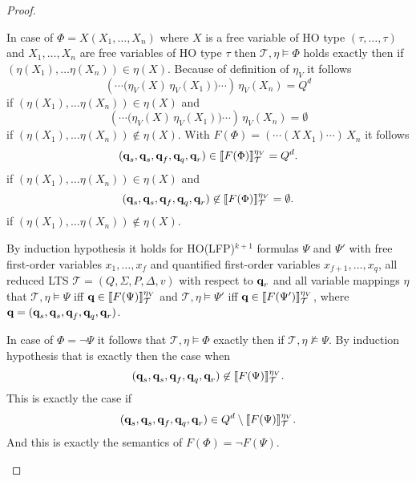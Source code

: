 \begin{proof}
\begin{compactitem}
        \item In case of $\Phi = X(X_1, \dots, X_n)$ where $X$ is a free variable of HO type $(\tau, \dots,
        \tau)$ and $X_1, \dots, X_n$ are free variables of HO type $\tau$ then $\mathcal{T}, \eta \models \Phi$
        holds exactly then if $(\eta(X_1), \dots \eta(X_n)) \in \eta(X)$. Because of definition of $\eta_V$ it follows
        \[(\dotsb\big(\eta_V(X)\,\eta_V(X_1)\big)\dotsb)\,\eta_V(X_n) = Q^d\]
        if $(\eta(X_1), \dots \eta(X_n)) \in \eta(X)$ and
        \[(\dotsb\big(\eta_V(X)\,\eta_V(X_1)\big)\dotsb)\,\eta_V(X_n) = \emptyset\]
        if $(\eta(X_1), \dots \eta(X_n)) \not\in \eta(X)$. With $F(\Phi) = (\dotsb (X\,X_1)\dotsb)\,X_n$
        it follows
        \[ (\emph{q}_s, \emph{q}_s, \emph{q}_f, \emph{q}_q, \emph{q}_r) \in \llbracket F(\Phi) \rrbracket^{\eta_V}_\mathcal{T} = Q^d.\]
        if $(\eta(X_1), \dots \eta(X_n))\in \eta(X)$ and
        \[ (\emph{q}_s, \emph{q}_s, \emph{q}_f, \emph{q}_q, \emph{q}_r) \not\in \llbracket F(\Phi)
        \rrbracket^{\eta_V}_\mathcal{T} = \emptyset.\]
        if $(\eta(X_1), \dots \eta(X_n)) \not\in \eta(X)$.
    \end{compactitem}
    
    By induction hypothesis it holds for HO(LFP)$^{k+1}$ formulas $\Psi$ and $\Psi'$ with free first-order variables $x_1,
    \dots, x_f$ and quantified first-order variables $x_{f+1}, \dots, x_q$, all reduced LTS $\mathcal{T} = (Q, \Sigma, P,
    \Delta, v)$ with respect to $\emph{q}_r$ and all variable mappings $\eta$  that $\mathcal{T}, \eta \models \Psi$ iff $\emph{q} \in \llbracket
   F(\Psi)\rrbracket^{\eta_V}_{\mathcal{T}}$ and $\mathcal{T}, \eta \models \Psi'$ iff $\emph{q} \in \llbracket
   F(\Psi')\rrbracket^{\eta_V}_{\mathcal{T}}$, where $\emph{q} =
    (\emph{q}_s, \emph{q}_s, \emph{q}_f, \emph{q}_q, \emph{q}_r)$.
    
    \begin{compactitem}
        \item In case of $\Phi = \neg \Psi$ it follows that $\mathcal{T}, \eta \models \Phi$ exactly then if
        $\mathcal{T}, \eta \not\models \Psi$. By induction hypothesis that is exactly then the case when
        \[ (\emph{q}_s, \emph{q}_s, \emph{q}_f, \emph{q}_q, \emph{q}_r) \not\in \llbracket F(\Psi) \rrbracket^{\eta_V}_\mathcal{T}.\]
        This is exactly the case if
        \[ (\emph{q}_s, \emph{q}_s, \emph{q}_f, \emph{q}_q, \emph{q}_r) \in Q^d \setminus \llbracket F(\Psi) \rrbracket^{\eta_V}_\mathcal{T}.\]
        And this is exactly the semantics of $F(\Phi) = \neg F(\Psi)$.


\end{compactitem}
\end{proof}
